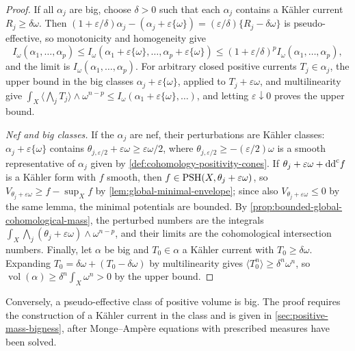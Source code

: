 \begin{proof}
If all $\alpha_j$ are big, choose $\delta>0$ such that each $\alpha_j$ contains a K\"ahler current $R_j\geq\delta\omega$. Then $(1+\varepsilon/\delta)\alpha_j-(\alpha_j+\varepsilon\{\omega\})=(\varepsilon/\delta)\{R_j-\delta\omega\}$ is pseudo-effective, so monotonicity and homogeneity give
\[
 I_\omega(\alpha_1,\ldots,\alpha_p)\leq I_\omega(\alpha_1+\varepsilon\{\omega\},\ldots,\alpha_p+\varepsilon\{\omega\})\leq(1+\varepsilon/\delta)^pI_\omega(\alpha_1,\ldots,\alpha_p),
\]
and the limit is $I_\omega(\alpha_1,\ldots,\alpha_p)$. For arbitrary closed positive currents $T_j\in\alpha_j$, the upper bound in the big classes $\alpha_j+\varepsilon\{\omega\}$, applied to $T_j+\varepsilon\omega$, and multilinearity give $\int_X\langle\bigwedge_jT_j\rangle\wedge\omega^{n-p}\leq I_\omega(\alpha_1+\varepsilon\{\omega\},\ldots)$, and letting $\varepsilon\downarrow0$ proves the upper bound.

\emph{Nef and big classes.} If the $\alpha_j$ are nef, their perturbations are K\"ahler classes: $\alpha_j+\varepsilon\{\omega\}$ contains $\theta_{j,\varepsilon/2}+\varepsilon\omega\geq\varepsilon\omega/2$, where $\theta_{j,\varepsilon/2}\geq-(\varepsilon/2)\omega$ is a smooth representative of $\alpha_j$ given by \cref{def:cohomology-positivity-cones}. If $\theta_j+\varepsilon\omega+\mathrm{dd}^{\mathrm{c}} f$ is a K\"ahler form with $f$ smooth, then $f\in\mathrm{PSH}(X,\theta_j+\varepsilon\omega)$, so $V_{\theta_j+\varepsilon\omega}\geq f-\sup_Xf$ by \cref{lem:global-minimal-envelope}; since also $V_{\theta_j+\varepsilon\omega}\leq0$ by the same lemma, the minimal potentials are bounded. By \cref{prop:bounded-global-cohomological-mass}, the perturbed numbers are the integrals $\int_X\bigwedge_j(\theta_j+\varepsilon\omega)\wedge\omega^{n-p}$, and their limits are the cohomological intersection numbers. Finally, let $\alpha$ be big and $T_0\in\alpha$ a K\"ahler current with $T_0\geq\delta\omega$. Expanding $T_0=\delta\omega+(T_0-\delta\omega)$ by multilinearity gives $\langle T_0^n\rangle\geq\delta^n\omega^n$, so $\operatorname{vol}(\alpha)\geq\delta^n\int_X\omega^n>0$ by the upper bound.
\end{proof}

Conversely, a pseudo-effective class of positive volume is big. The proof requires the construction of a K\"ahler current in the class and is given in \cref{sec:positive-mass-bigness}, after Monge--Amp\`ere equations with prescribed measures have been solved.

